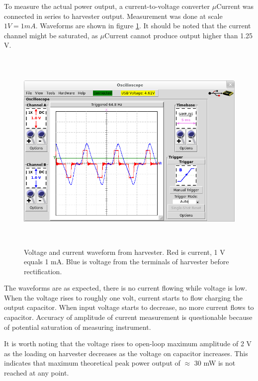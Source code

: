 To measure the actual power output, a current-to-voltage converter $\mu$Current \cite{muCurrent} was connected in series to harvester output. Measurement was done at scale $1 V = 1 mA$. Waveforms are shown in figure \ref{fig:inductive_vi_65}. It should be noted that the current channel might be saturated, as $\mu$Current cannot produce output higher than 1.25 V.

\begin{figure}[htb]
\begin{center}
\includegraphics[height=10cm]{images/own_measurement/generator_shaker/inductive_td_harvesting_vi_65hz_ferro.png}
\end{center}
\caption{\label{fig:inductive_vi_65} Voltage and current waveform from harvester. Red is current, 1 V equals 1 mA. Blue is voltage from the terminals of harvester before rectification.}
\end{figure}

The waveforms are as expected, there is no current flowing while voltage is low. When the voltage rises to roughly one volt, current starts to flow charging the output capacitor. When input voltage starts to decrease, no more current flows to capacitor. Accuracy of amplitude of current measurement is questionable because of potential saturation of measuring instrument.

It is worth noting that the voltage rises to open-loop maximum amplitude of 2 V as the loading on harvester decreases as the voltage on capacitor increases. This indicates that maximum theoretical peak power output of $\approx$ 30 mW is not reached at any point. 

